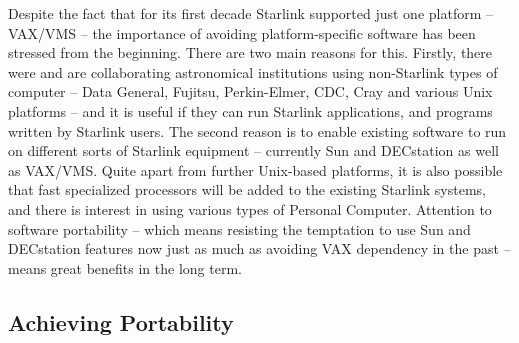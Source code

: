\documentclass[twoside,11pt,nolof,noabs]{starlink}
\renewcommand{\_}{{\tt\char'137}}
\begin{document}
Despite the fact that for its first decade Starlink supported just
one platform -- VAX/VMS -- the importance of avoiding platform-specific
software has been stressed from the beginning.  There are two main
reasons for this.  Firstly, there were and are
collaborating astronomical institutions using non-Starlink types
of computer -- Data General, Fujitsu, Perkin-Elmer, CDC, Cray and various
Unix platforms -- and it is useful if they can run Starlink applications,
and programs written by Starlink users.
The second reason is to enable existing
software to run on different sorts of Starlink equipment -- currently
Sun and DECstation as well as VAX/VMS.  Quite apart from further
Unix-based platforms,
it is also possible that fast specialized processors will be added to
the existing Starlink systems, and there is interest in using
various types of Personal Computer.  Attention
to software portability -- which means resisting the temptation
to use Sun and DECstation features now
just as much as avoiding VAX dependency in the past -- means great
benefits in the long term.

\subsection{Achieving Portability}
\end{document}
